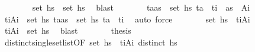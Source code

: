 \begin{isabellebody}
\ \ \ \ \ \ \isamarkupfalse%
\ {\isacartoucheopen}set\ {\isacharquery}{\kern0pt}hs{\isacharprime}{\kern0pt}\ {\isasymsubseteq}\ set\ hs{\isacartoucheclose}\ \isamarkupfalse%
\ blast\isanewline
\ \ \ \ \isamarkupfalse%
\ \isamarkupfalse%
\ {\isachardoublequoteopen}{\isasymforall}{\isacharparenleft}{\kern0pt}t\isactrlsub a{\isacharcomma}{\kern0pt}as{\isacharprime}{\kern0pt}{\isacharparenright}{\kern0pt}\ {\isasymin}\ set\ {\isacharquery}{\kern0pt}hs{\isacharprime}{\kern0pt}{\isachardot}{\kern0pt}\ t\isactrlsub a\ {\isacharequal}{\kern0pt}\ t\isactrlsub i\ {\isasymand}\ as{\isacharprime}{\kern0pt}\ {\isacharequal}{\kern0pt}\ A\isactrlsub i{\isachardoublequoteclose}\isanewline
\ \ \ \ \ \ \isamarkupfalse%
\ {\isacartoucheopen}{\isacharparenleft}{\kern0pt}t\isactrlsub i{\isacharcomma}{\kern0pt}A\isactrlsub i{\isacharparenright}{\kern0pt}\ {\isasymin}\ set\ {\isacharquery}{\kern0pt}hs{\isacharprime}{\kern0pt}{\isacartoucheclose}\ {\isacartoucheopen}{\isasymforall}{\isacharparenleft}{\kern0pt}t\isactrlsub a{\isacharcomma}{\kern0pt}as{\isacharparenright}{\kern0pt}\ {\isasymin}\ set\ {\isacharquery}{\kern0pt}hs{\isacharprime}{\kern0pt}{\isachardot}{\kern0pt}\ t\isactrlsub a\ {\isacharequal}{\kern0pt}\ t\isactrlsub i{\isacartoucheclose}\ \isamarkupfalse%
\ auto\ force\isanewline
\ \ \ \ \isamarkupfalse%
\ \isamarkupfalse%
\ {\isachardoublequoteopen}set\ {\isacharquery}{\kern0pt}hs{\isacharprime}{\kern0pt}\ {\isacharequal}{\kern0pt}\ {\isacharbraceleft}{\kern0pt}{\isacharparenleft}{\kern0pt}t\isactrlsub i{\isacharcomma}{\kern0pt}A\isactrlsub i{\isacharparenright}{\kern0pt}{\isacharbraceright}{\kern0pt}{\isachardoublequoteclose}\isanewline
\ \ \ \ \ \ \isamarkupfalse%
\ {\isacartoucheopen}{\isacharparenleft}{\kern0pt}t\isactrlsub i{\isacharcomma}{\kern0pt}A\isactrlsub i{\isacharparenright}{\kern0pt}\ {\isasymin}\ set\ {\isacharquery}{\kern0pt}hs{\isacharprime}{\kern0pt}{\isacartoucheclose}\ \isamarkupfalse%
\ blast\isanewline
\ \ \ \ \isamarkupfalse%
\ \isamarkupfalse%
\ {\isacharquery}{\kern0pt}thesis\isanewline
\ \ \ \ \ \ \isamarkupfalse%
\ distinct{\isacharunderscore}{\kern0pt}single{\isacharunderscore}{\kern0pt}set{\isacharunderscore}{\kern0pt}list{\isacharbrackleft}{\kern0pt}OF\ {\isacartoucheopen}set\ {\isacharquery}{\kern0pt}hs{\isacharprime}{\kern0pt}\ {\isacharequal}{\kern0pt}\ {\isacharbraceleft}{\kern0pt}{\isacharparenleft}{\kern0pt}t\isactrlsub i{\isacharcomma}{\kern0pt}A\isactrlsub i{\isacharparenright}{\kern0pt}{\isacharbraceright}{\kern0pt}{\isacartoucheclose}\ {\isacartoucheopen}distinct\ {\isacharquery}{\kern0pt}hs{\isacharprime}{\kern0pt}{\isacartoucheclose}{\isacharbrackright}{\kern0pt}\ \isamarkupfalse%

\end{isabellebody}
